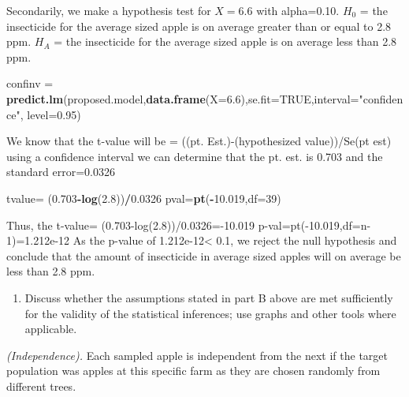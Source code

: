 \documentclass[12pt,]{article}
\newenvironment{Shaded}{\begin{snugshade}}{\end{snugshade}}
\newcommand{\KeywordTok}[1]{\textcolor[rgb]{0.13,0.29,0.53}{\textbf{#1}}}
\newcommand{\DataTypeTok}[1]{\textcolor[rgb]{0.13,0.29,0.53}{#1}}
\newcommand{\DecValTok}[1]{\textcolor[rgb]{0.00,0.00,0.81}{#1}}
\newcommand{\FloatTok}[1]{\textcolor[rgb]{0.00,0.00,0.81}{#1}}
\newcommand{\StringTok}[1]{\textcolor[rgb]{0.31,0.60,0.02}{#1}}
\newcommand{\OtherTok}[1]{\textcolor[rgb]{0.56,0.35,0.01}{#1}}
\newcommand{\OperatorTok}[1]{\textcolor[rgb]{0.81,0.36,0.00}{\textbf{#1}}}
\newcommand{\NormalTok}[1]{#1}
\providecommand{\tightlist}{%
  \setlength{\itemsep}{0pt}\setlength{\parskip}{0pt}}
\begin{document}
Secondarily, we make a hypothesis test for \(X=6.6\) with alpha=0.10.
\(H_0\) = the insecticide for the average sized apple is on average
greater than or equal to 2.8 ppm. \(H_A\) = the insecticide for the
average sized apple is on average less than 2.8 ppm.

\begin{Shaded}
\begin{Highlighting}[]
\NormalTok{confinv =}\StringTok{ }\KeywordTok{predict.lm}\NormalTok{(proposed.model,}\KeywordTok{data.frame}\NormalTok{(}\DataTypeTok{X=}\FloatTok{6.6}\NormalTok{),}\DataTypeTok{se.fit=}\OtherTok{TRUE}\NormalTok{,}\DataTypeTok{interval=}\StringTok{"confidence"}\NormalTok{, }\DataTypeTok{level=}\FloatTok{0.95}\NormalTok{)}
\end{Highlighting}
\end{Shaded}

We know that the t-value will be = ((pt. Est.)-(hypothesized
value))/Se(pt est) using a confidence interval we can determine that the
pt. est. is 0.703 and the standard error=0.0326

\begin{Shaded}
\begin{Highlighting}[]
\NormalTok{tvalue=}\StringTok{ }\NormalTok{(}\FloatTok{0.703}\OperatorTok{-}\KeywordTok{log}\NormalTok{(}\FloatTok{2.8}\NormalTok{))}\OperatorTok{/}\FloatTok{0.0326}
\NormalTok{pval=}\KeywordTok{pt}\NormalTok{(}\OperatorTok{-}\FloatTok{10.019}\NormalTok{,}\DataTypeTok{df=}\DecValTok{39}\NormalTok{)}
\end{Highlighting}
\end{Shaded}

Thus, the t-value= (0.703-log(2.8))/0.0326=-10.019
p-val=pt(-10.019,df=n-1)=1.212e-12 As the p-value of
1.212e-12\textless{} 0.1, we reject the null hypothesis and conclude
that the amount of insecticide in average sized apples will on average
be less than 2.8 ppm.

\begin{enumerate}
\def\labelenumi{\alph{enumi})}
\setcounter{enumi}{3}
\tightlist
\item
  Discuss whether the assumptions stated in part B above are met
  sufficiently for the validity of the statistical inferences; use
  graphs and other tools where applicable.
\end{enumerate}

\emph{(Independence).} Each sampled apple is independent from the next
if the target population was apples at this specific farm as they are
chosen randomly from different trees.
\end{document}
